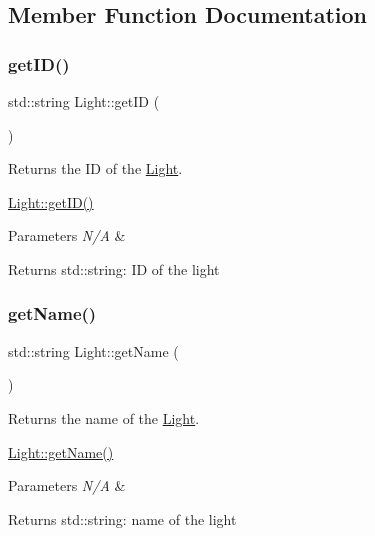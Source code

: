 \subsection{Member Function Documentation}
\mbox{\label{class_light_a7a41305231132e8bae6a899b703fd39a}} 
\subsubsection{\texorpdfstring{get\+I\+D()}{getID()}}
{\footnotesize\ttfamily std\+::string Light\+::get\+ID (\begin{DoxyParamCaption}{ }\end{DoxyParamCaption})}



Returns the ID of the \hyperlink{class_light}{Light}. 

\hyperlink{class_light_a7a41305231132e8bae6a899b703fd39a}{Light\+::get\+I\+D()} 
\begin{DoxyParams}{Parameters}
{\em N/A} & \\
\hline
\end{DoxyParams}
\begin{DoxyReturn}{Returns}
std\+::string\+: ID of the light 
\end{DoxyReturn}
\mbox{\label{class_light_a248c379885ea63ee7d71f7e19b0dab80}} 
\subsubsection{\texorpdfstring{get\+Name()}{getName()}}
{\footnotesize\ttfamily std\+::string Light\+::get\+Name (\begin{DoxyParamCaption}{ }\end{DoxyParamCaption})}



Returns the name of the \hyperlink{class_light}{Light}. 

\hyperlink{class_light_a248c379885ea63ee7d71f7e19b0dab80}{Light\+::get\+Name()} 
\begin{DoxyParams}{Parameters}
{\em N/A} & \\
\hline
\end{DoxyParams}
\begin{DoxyReturn}{Returns}
std\+::string\+: name of the light 
\end{DoxyReturn}
\mbox{\label{class_light_a287da1d58d038e10899c38f8464cbc22}} 
